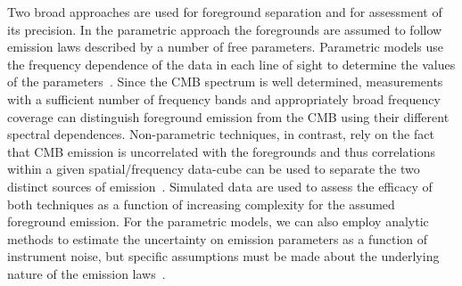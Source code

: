 \documentclass[PICOReport.tex]{subfiles}
\begin{document}


Two broad approaches are used for foreground separation and for assessment of its precision.  In the parametric approach the foregrounds are assumed to follow emission laws described by a number of free parameters. Parametric models use the frequency dependence of the data in each line of sight to determine the values of the parameters~\citep{eriksen/etal:2008}.  Since the CMB spectrum is well determined, measurements with a sufficient number of frequency bands and appropriately broad frequency coverage can distinguish foreground emission from the CMB using their different spectral dependences. Non-parametric techniques, in contrast, rely on the fact that CMB emission is uncorrelated with the foregrounds and thus correlations within a given spatial/frequency data-cube can be used to separate the two distinct sources of emission~\citep{delabrouille2003,Cardoso2008,delabrouille2009,nilc,gnilc}.  Simulated data are used to assess the efficacy of both techniques as a function of increasing complexity for the assumed foreground emission. For the parametric models, we can also employ analytic methods to estimate the uncertainty on emission parameters as a function of instrument noise, but specific assumptions must be made about the underlying nature of the emission laws~\citep{errard_and_finney}. 
\end{document}
